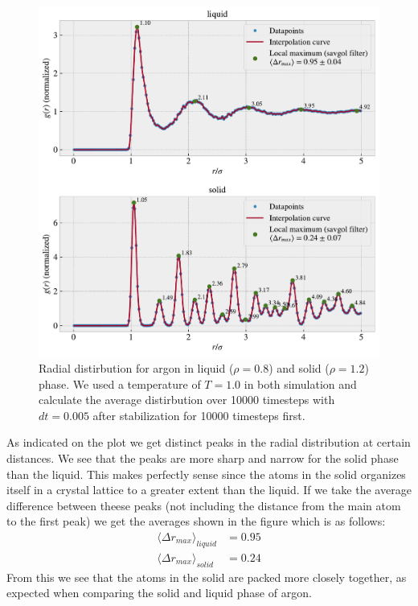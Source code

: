 \documentclass[reprint, amsmath, amssymb, aps]{revtex4-2}
\begin{document}
\begin{figure}[H]
  \includegraphics[width=\linewidth]{figures/rdf.pdf}
  \caption{Radial distirbution for argon in liquid ($\rho = 0.8$) and solid ($\rho = 1.2$) phase. We used a temperature of $T = 1.0$ in both simulation and calculate the average distirbution over 10000 timesteps with $dt = 0.005$ after stabilization for 10000 timesteps first.}
  \label{fig:rdf}
\end{figure}

As indicated on the plot we get distinct peaks in the radial distribution at certain distances. We see that the peaks are more sharp and narrow for the solid phase than the liquid. This makes perfectly sense since the atoms in the solid organizes itself in a crystal lattice to a greater extent than the liquid. If we take the average difference between theese peaks (not including the distance from the main atom to the first peak) we get the averages shown in the figure which is as follows:
\begin{align*}
  \langle \Delta r_{max} \rangle_{liquid} &= 0.95 \\
  \langle \Delta r_{max} \rangle_{solid} &= 0.24
\end{align*}
From this we see that the atoms in the solid are packed more closely together, as expected when comparing the solid and liquid phase of argon.
%
%
\end{document}
